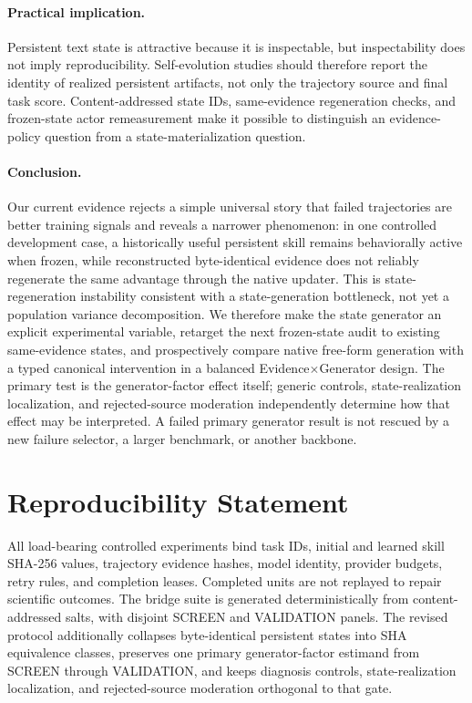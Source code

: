 \paragraph{Practical implication.}
Persistent text state is attractive because it is inspectable, but inspectability does not imply reproducibility. Self-evolution studies should therefore report the identity of realized persistent artifacts, not only the trajectory source and final task score. Content-addressed state IDs, same-evidence regeneration checks, and frozen-state actor remeasurement make it possible to distinguish an evidence-policy question from a state-materialization question.

\paragraph{Conclusion.}
Our current evidence rejects a simple universal story that failed trajectories are better training signals and reveals a narrower phenomenon: in one controlled development case, a historically useful persistent skill remains behaviorally active when frozen, while reconstructed byte-identical evidence does not reliably regenerate the same advantage through the native updater. This is state-regeneration instability consistent with a state-generation bottleneck, not yet a population variance decomposition. We therefore make the state generator an explicit experimental variable, retarget the next frozen-state audit to existing same-evidence states, and prospectively compare native free-form generation with a typed canonical intervention in a balanced Evidence$\times$Generator design. The primary test is the generator-factor effect itself; generic controls, state-realization localization, and rejected-source moderation independently determine how that effect may be interpreted. A failed primary generator result is not rescued by a new failure selector, a larger benchmark, or another backbone.

\section*{Reproducibility Statement}
All load-bearing controlled experiments bind task IDs, initial and learned skill SHA-256 values, trajectory evidence hashes, model identity, provider budgets, retry rules, and completion leases. Completed units are not replayed to repair scientific outcomes. The bridge suite is generated deterministically from content-addressed salts, with disjoint SCREEN and VALIDATION panels. The revised protocol additionally collapses byte-identical persistent states into SHA equivalence classes, preserves one primary generator-factor estimand from SCREEN through VALIDATION, and keeps diagnosis controls, state-realization localization, and rejected-source moderation orthogonal to that gate.

